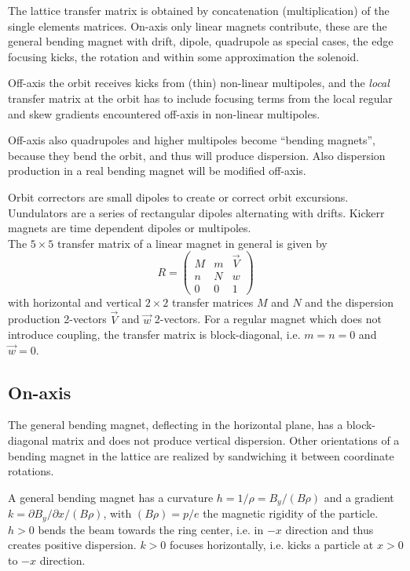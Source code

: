 \documentclass[12pt]{article}
\newcommand\beq{\begin{equation}}
\newcommand\eeq{\end{equation}}
\newcommand\pt{\partial}
\begin{document}
The lattice transfer matrix is obtained by concatenation (multiplication) of the single elements matrices. On-axis only linear magnets contribute, these are the general bending magnet with drift, dipole, quadrupole as special cases, the edge focusing kicks,  the rotation and within some approximation the solenoid.

Off-axis the orbit receives kicks from (thin) non-linear multipoles, and the {\em local} transfer matrix at the orbit has to include focusing terms from the local regular and skew gradients encountered off-axis in non-linear multipoles.

Off-axis also quadrupoles and higher multipoles become ``bending magnets'', because they bend the orbit, and thus will produce dispersion. Also dispersion production in a real bending magnet will be modified off-axis.

Orbit correctors are small dipoles to create or correct orbit excursions. Uundulators are a series of rectangular dipoles alternating with drifts. Kickerr magnets are time dependent dipoles or multipoles.\\

The $5\times 5$ transfer matrix of a linear magnet in general is given by
\beq
R = \left( \begin{array}{cc|c} M & m & \vec{V} \\ n & N & w \\ 0 & 0 & 1 \end{array} \right)
\eeq
with horizontal and vertical $2\times 2$ transfer matrices $M$ and $N$ and the dispersion production 2-vectors $\vec{V}$ and $\vec{w}$ 2-vectors.
For a regular magnet which does not introduce coupling, the transfer matrix is block-diagonal, i.e. $m=n=0$ and $\vec{w}=0$.\\

\subsection{On-axis}

The general bending magnet, deflecting in the horizontal plane, has a block-diagonal matrix and does not produce vertical dispersion. Other orientations of a bending magnet in the lattice are realized by sandwiching it between coordinate rotations.
\par
A general bending magnet has a curvature $h=1/\rho=B_y/(B\rho)$ and a gradient
$k=\pt B_y/\pt x/(B\rho)$, with $(B\rho)=p/e$ the magnetic rigidity of the particle.
$h>0$ bends the beam towards the ring center, i.e. in $-x$ direction and thus creates positive dispersion. $k>0$ focuses horizontally, i.e. kicks a particle at $x>0$ to $-x$ direction.
\end{document}
